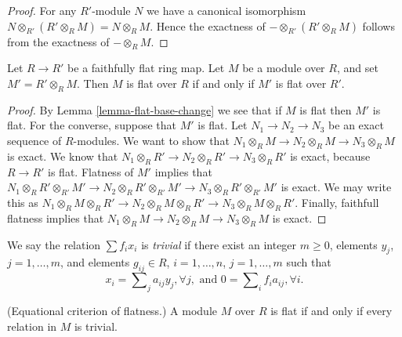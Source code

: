 \begin{proof}
For any $R'$-module $N$ we have a canonical
isomorphism $N \otimes_{R'} (R'\otimes_R M)
= N \otimes_R M$. Hence the exactness of
$-\otimes_{R'}(R'\otimes_R M)$ follows from
the exactness of $-\otimes_R M$.
\end{proof}

\begin{lemma}
\label{lemma-flatness-descends}
Let $R \to R'$ be a faithfully flat ring map.
Let $M$ be a module over $R$, and set $M' = R' \otimes_R M$.
Then $M$ is flat over $R$ if and only if $M'$ is flat over $R'$.
\end{lemma}

\begin{proof}
By Lemma \ref{lemma-flat-base-change} we see that if $M$ is flat
then $M'$ is flat. For the converse, suppose that $M'$ is flat.
Let $N_1 \to N_2 \to N_3$ be an exact sequence of $R$-modules.
We want to show that $N_1 \otimes_R M \to N_2 \otimes_R M \to N_3 \otimes_R M$
is exact. We know that
$N_1 \otimes_R R' \to N_2 \otimes_R R' \to N_3 \otimes_R R'$ is
exact, because $R \to R'$ is flat. Flatness of $M'$ implies that
$N_1 \otimes_R R' \otimes_{R'} M'
\to N_2 \otimes_R R' \otimes_{R'} M'
\to N_3 \otimes_R R' \otimes_{R'} M'$ is exact.
We may write this as
$N_1 \otimes_R M \otimes_R R'
\to N_2 \otimes_R M \otimes_R R'
\to N_3 \otimes_R M \otimes_R R'$.
Finally, faithfull flatness implies that
$N_1 \otimes_R M \to N_2 \otimes_R M \to N_3 \otimes_R M$
is exact.
\end{proof}

\noindent
We say the relation $\sum f_i x_i$
is {\it trivial} if there exist an integer $m \geq 0$,
elements $y_j$, $j=1,\ldots, m$, and elements $g_{ij} \in R$,
$i=1,\ldots,n$, $j=1,\ldots,m$ such that
$$
x_i = \sum\nolimits_j a_{ij} y_j, \forall j,
\text{ and }
0 = \sum\nolimits_i f_ia_{ij}, \forall i.
$$

\begin{lemma}
\label{lemma-flat-eq}
(Equational criterion of flatness.)
A module $M$ over $R$ is flat if and only if
every relation in $M$ is trivial.
\end{lemma}

